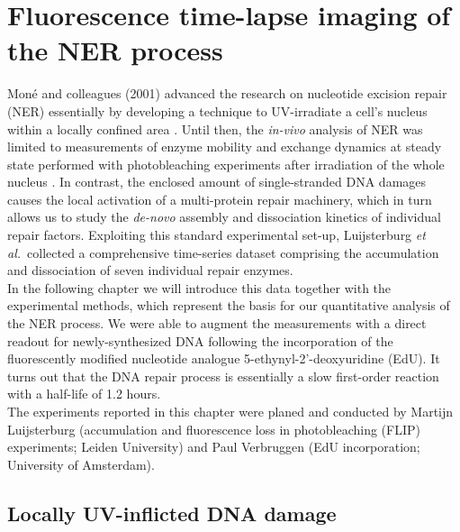 \chapter{Fluorescence time-lapse imaging of the NER process}
\label{chap:quantData}
\pagestyle{plain}


Mon\'{e} and colleagues (2001) advanced the research on nucleotide excision repair (NER) essentially by developing a technique to UV-irradiate a cell's nucleus within a locally confined area \cite{Mone2001}. Until then, the \textit{in-vivo} analysis of NER was limited to measurements of enzyme mobility and exchange dynamics at steady state performed with photobleaching experiments after irradiation of the whole nucleus \cite{Houtsmuller2001,Mone2004,Vermeulen2011}. In contrast, the enclosed amount of single-stranded DNA damages causes the local activation of a multi-protein repair machinery, which in turn allows us to study the \textit{de-novo} assembly and dissociation kinetics of individual repair factors. Exploiting this standard experimental set-up, Luijsterburg \textit{et al.}\ collected a comprehensive time-series dataset comprising the accumulation and dissociation of seven individual repair enzymes.\\ 
In the following chapter we will introduce this data together with the experimental methods, which represent the basis for our quantitative analysis of the NER process. We were able to augment the measurements with a direct readout for newly-synthesized DNA following the incorporation of the fluorescently modified nucleotide analogue 5-ethynyl-2'-deoxyuridine (EdU). It turns out that the DNA repair process is essentially a slow first-order reaction with a half-life of 1.2 hours.   \\


The experiments reported in this chapter were planed and conducted by Martijn Luijsterburg (accumulation and fluorescence loss in photobleaching (FLIP) experiments; Leiden University) and Paul Verbruggen (EdU incorporation; University of Amsterdam).
	
	


\section{Locally UV-inflicted DNA damage}
\label{sec:local_irradiation}
 


